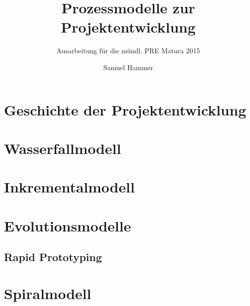 \documentclass[]{scrreprt}
\author{Samuel Hammer}
\title{Prozessmodelle zur Projektentwicklung}
\subtitle{Ausarbeitung für die mündl. PRE Matura 2015}
\begin{document}
\maketitle
\tableofcontents

\chapter{Geschichte der Projektentwicklung}
\blindtext
\chapter{Wasserfallmodell}
\blindtext
\chapter{Inkrementalmodell}
\blindtext
\chapter{Evolutionsmodelle}
\blindtext
\section{Rapid Prototyping}
\blindtext
\chapter{Spiralmodell}
\blindtext
\end{document}

